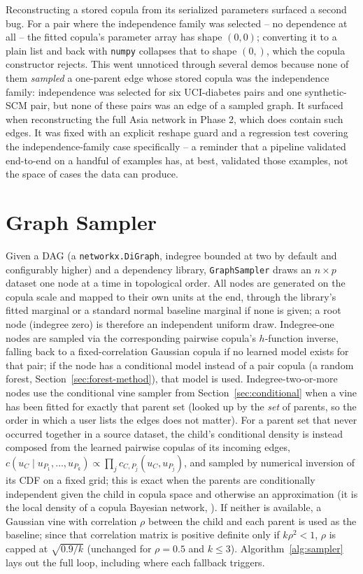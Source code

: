 \documentclass[
  english,
  class=report,
  accentcolor=2c,
  marginpar=false,
  parskip=half-,
  fontsize=11pt,
  ruledheaders=false,
  pdfa=false,
  IMRAD=false,
  thesis={type=master}
]{tudapub}
\begin{document}
Reconstructing a stored copula from its serialized parameters surfaced a
second bug. For a pair where the independence family was selected -- no
dependence at all -- the fitted copula's parameter array has shape
$(0,0)$; converting it to a plain list and back with \texttt{numpy} collapses
that to shape $(0,)$, which the copula constructor rejects. This went
unnoticed through several demos because none of them \emph{sampled} a
one-parent edge whose stored copula was the independence family:
independence was selected for six UCI-diabetes pairs and one synthetic-SCM
pair, but none of these pairs was an edge of a sampled graph. It surfaced
when reconstructing the full Asia network in Phase 2, which does contain
such edges. It was fixed with an explicit reshape guard and a regression test
covering the independence-family case specifically -- a reminder that a
pipeline validated end-to-end on a handful of examples has, at best,
validated those examples, not the space of cases the data can produce.

\section{Graph Sampler}
\label{sec:sampler}
Given a DAG (a \texttt{networkx.DiGraph}, indegree bounded at two by default
and configurably higher) and a dependency library, \texttt{GraphSampler}
draws an $n \times p$ dataset one node at a time in topological order.
All nodes are generated on the copula scale and mapped to their own units at
the end, through the library's fitted marginal or a standard normal baseline
marginal if none is given; a root node (indegree zero) is therefore an
independent uniform draw. Indegree-one nodes are sampled via the
corresponding pairwise copula's $h$-function inverse, falling back to a
fixed-correlation Gaussian copula if no learned model exists for that pair;
if the node has a conditional model instead of a pair copula (a random
forest, Section~\ref{sec:forest-method}), that model is used. Indegree-two-or-more nodes
use the conditional vine sampler from Section~\ref{sec:conditional} when a
vine has been fitted for exactly that parent set (looked up by the
\emph{set} of parents, so the order in which a user lists the edges does
not matter). For a parent set that never occurred together in a source
dataset, the child's conditional density is instead composed from the
learned pairwise copulas of its incoming edges,
$c(u_C \mid u_{P_1},\dots,u_{P_k}) \propto \prod_j c_{C,P_j}(u_C, u_{P_j})$,
and sampled by numerical inversion of its CDF on a fixed grid; this is
exact when the parents are conditionally independent given the child in
copula space and otherwise an approximation (it is the local density of a
copula Bayesian network, \cite{elidan2010}). If neither is available, a
Gaussian vine with correlation $\rho$ between the child and each parent is
used as the baseline; since that correlation matrix is positive definite
only if $k\rho^2 < 1$, $\rho$ is capped at $\sqrt{0.9/k}$ (unchanged for
$\rho = 0.5$ and $k \le 3$). Algorithm~\ref{alg:sampler} lays out the full
loop, including where each fallback triggers.
\end{document}
